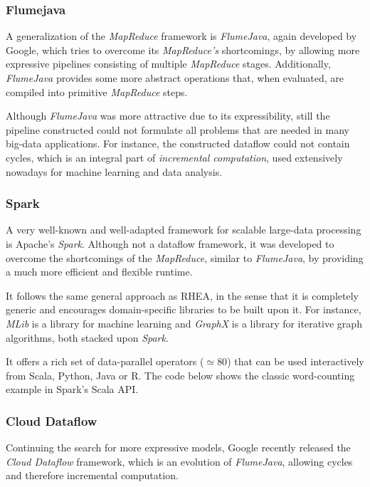 \documentclass[sigplan,review,anonymous]{acmart}
\begin{document}
\subsubsection{Flumejava}

A generalization of the \textit{MapReduce} framework is \textit{FlumeJava},
again developed by Google, which tries to overcome its \textit{MapReduce's }
shortcomings, by allowing more expressive pipelines consisting of multiple
\textit{MapReduce} stages. Additionally, \textit{FlumeJava} provides some more
abstract operations that, when evaluated, are compiled into primitive
\textit{MapReduce} steps.

Although \textit{FlumeJava} was more attractive due to its expressibility, still
the pipeline constructed could not formulate all problems that are needed in
many big-data applications. For instance, the constructed dataflow could not
contain cycles, which is an integral part of \textit{incremental computation},
used extensively nowadays for machine learning and data analysis.

\subsubsection{Spark}

A very well-known and well-adapted framework for scalable large-data processing
is Apache's \textit{Spark}. Although not a
dataflow framework, it was developed to overcome the shortcomings of the
\textit{MapReduce}, similar to \textit{FlumeJava}, by providing a much more
efficient and flexible runtime.

It follows the same general approach as \textsc{RHEA}, in the sense that it is
completely generic and encourages domain-specific libraries to be built upon it.
For instance, \textit{MLib} is a library for machine learning and
\textit{GraphX} is a library for iterative graph algorithms, both stacked upon
\textit{Spark}.

It offers a rich set of data-parallel operators ($\simeq 80$) that can be used
interactively from Scala, Python, Java or R. The code below shows the classic
word-counting example in Spark's Scala API.


\subsubsection{Cloud Dataflow}

Continuing the search for more expressive models, Google recently released the
\textit{Cloud Dataflow} framework,
which is an evolution of \textit{FlumeJava}\cite{flumejava}, allowing cycles and
therefore incremental computation.
\end{document}
